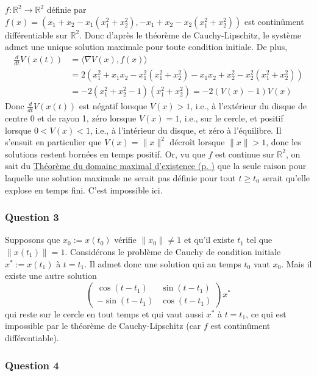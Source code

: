 \(f:\mathbb{R}^2 \to \mathbb{R}^2\) définie par
\(f(x) =(x_1+x_2-x_1(x_1^2+x_2^2) ,-x_1+x_2-x_2(x_1^2+x_2^2))\) est
continûment différentiable sur \(\mathbb{R}^2\). Donc d'après le
théorème de Cauchy-Lipschitz, le système admet une unique solution
maximale pour toute condition initiale. De plus, \begin{align*}
\frac{d}{dt}V(x(t)) &= \langle \nabla V(x) , f(x) \rangle \\
&= 2(x_1^2+x_1x_2-x_1^2(x_1^2+x_2^2) -x_1x_2 +x_2^2 - x_2^2(x_1^2+x_2^2))\\
&= -2(x_1^2+x_2^2-1)(x_1^2+x_2^2) = -2 (V(x)-1)V(x)
\end{align*} Donc \(\frac{d}{dt}V(x(t))\) est négatif lorsque
\(V(x)>1\), i.e., à l'extérieur du disque de centre 0 et de rayon 1,
zéro lorsque \(V(x)=1\), i.e., sur le cercle, et positif lorsque
\(0<V(x)<1\), i.e., à l'intérieur du disque, et zéro à l'équilibre. Il
s'ensuit en particulier que \(V(x)=\|x\|^2\) décroît lorsque
\(\|x\|>1\), donc les solutions restent bornées en temps positif. Or, vu
que \(f\) est continue sur \(\mathbb{R}^2\), on sait du
\protect\hyperlink{theo_bouts}{Théorème du domaine maximal d'existence
(p. \pageref*{theo_bouts})} que la seule raison pour laquelle une
solution maximale ne serait pas définie pour tout \(t\geq t_0\) serait
qu'elle explose en temps fini. C'est impossible ici.

\hypertarget{answer-cycle-lim-3}{%
\subsubsection*{Question 3}\label{answer-cycle-lim-3}}


Supposons que \(x_0:=x(t_0)\) vérifie \(\|x_0\|\neq 1\) et qu'il existe
\(t_1\) tel que \(\|x(t_1)\|= 1\). Considérons le problème de Cauchy de
condition initiale \(x^*:=x(t_1)\) à \(t=t_1\). Il admet donc une
solution qui au temps \(t_0\) vaut \(x_0\). Mais il existe une autre
solution \[
\left(
\begin{matrix}
\cos(t-t_1) & \sin(t-t_1) \\
-\sin(t-t_1) & \cos(t-t_1)
\end{matrix}
\right) x^*
\] qui reste sur le cercle en tout temps et qui vaut aussi \(x^*\) à
\(t=t_1\), ce qui est impossible par le théorème de Cauchy-Lipschitz
(car \(f\) est continûment différentiable).

\hypertarget{answer-cycle-lim-4}{%
\subsubsection*{Question 4}\label{answer-cycle-lim-4}}

